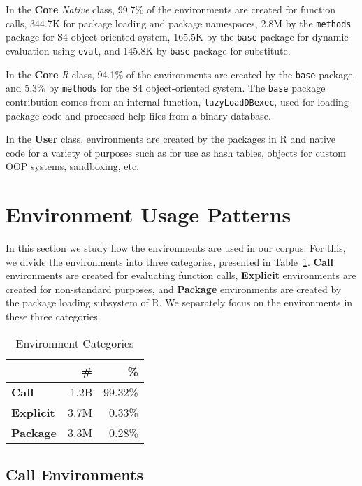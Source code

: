 \documentclass[10pt,review,sigplan,anonymous=true,authorversion=true,nonacm=true]{acmart}
\newcommand{\code}[1]{\lstinline |#1|\xspace}
\begin{document}
In the \textbf{Core} \emph{Native} class, 99.7\% of the environments are created
for function calls, 344.7K for package loading and package namespaces, 2.8M by
the \code{methods} package for S4 object-oriented system, 165.5K by the
\code{base} package for dynamic evaluation using \code{eval}, and 145.8K by
\code{base} package for substitute.

In the \textbf{Core} \emph{R} class, 94.1\% of the environments are created by
the \code{base} package, and 5.3\% by \code{methods} for the S4 object-oriented
system. The \code{base} package contribution comes from an internal function,
\code{lazyLoadDBexec}, used for loading package code and processed help files
from a binary database.

In the \textbf{User} class, environments are created by the packages in R and
native code for a variety of purposes such as for use as hash tables, objects
for custom OOP systems, sandboxing, etc.


\section{Environment Usage Patterns}

In this section we study how the environments are used in our corpus. For this,
we divide the environments into three categories, presented in
Table~\ref{table:env_category}. \textbf{Call} environments are created for
evaluating function calls, \textbf{Explicit} environments are created for
non-standard purposes, and \textbf{Package} environments are created by the
package loading subsystem of R. We separately focus on the environments in these
three categories.

\begin{table}[!h]
  \vspace{-3mm} \small
  \caption{Environment Categories} \label{table:env_category}
  \centering
  \begin{tabular}{lrr}
    \toprule
    &\textbf{\#}&\textbf{\%}\\
    \midrule
    \textbf{Call}&1.2B&99.32\%\\
    \textbf{Explicit}&3.7M&0.33\%\\
    \textbf{Package}&3.3M&0.28\%\\
    \bottomrule
  \end{tabular}
\end{table}


\subsection{Call Environments}
\end{document}
